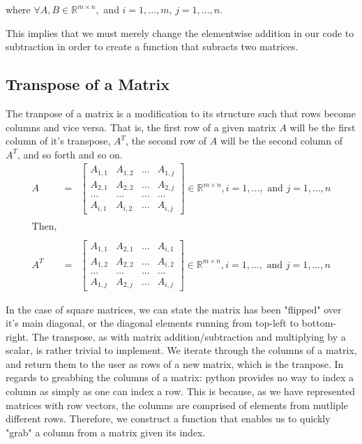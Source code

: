\documentclass[12pt, a4paper]{article}
\begin{document}
where $ \forall A, B \in \mathbb{R}^{m\times n}, $ and $i = 1,..., m$, $j = 1,..., n$.

This implies that we must merely change the elementwise addition in our code to subtraction in order to create
a function that subracts two matrices.

\subsection{Transpose of a Matrix}

The tranpose of a matrix is a modification to its structure such that rows become columns and vice versa. That is, the first row of a given matrix
$A$ will be the first column of it's transpose, $A^{T}$, the second row of $A$ will be the second column of $A^{T}$, and so forth and so on.
\newline
\begin{eqnarray*}
    A &=& \begin{bmatrix}
        A_{1,1}  & A_{1,2} & ... & A_{1,j}\\
        A_{2,1} & A_{2,2} & ... & A_{2,j}\\
        ... & ... & ... & ... \\
        A_{i,1} & A_{i,2} & ... & A_{i,j}
    \end{bmatrix} \in \mathbb{R}^{m\times n}, i=1,...,\text{ and }j=1,...,n
    \\
    \\
    \text{Then,}
    \\
    \\
    A^{T} &=& \begin{bmatrix}
        A_{1,1}  & A_{2,1} & ... & A_{i,1}\\
        A_{1,2} & A_{2,2} & ... & A_{i,2}\\
        ... & ... & ... & ... \\
        A_{1,j} & A_{2,j} & ... & A_{i,j}
    \end{bmatrix} \in \mathbb{R}^{m\times n}, i=1,...,\text{ and }j=1,...,n
\end{eqnarray*}

In the case of square matrices, we can state the matrix has been "flipped" over it's main diagonal, 
or the diagonal elements running from top-left to bottom-right.
\newline
The transpose, as with matrix addition/subtraction and multiplying by a scalar, is rather trivial to implement. 
We iterate through the columns of a matrix, and return them to the user as rows of a new matrix, which is the tranpose. 
In regards to greabbing the columns of a matrix: python provides no way to index a column as simply as one can index a row. 
This is because, as we have represented matrices with row vectors, the columns are comprised of elements from mutliple different rows. 
Therefore, we construct a function that enables us to quickly "grab" a column from a matrix given its index. 
\end{document}
